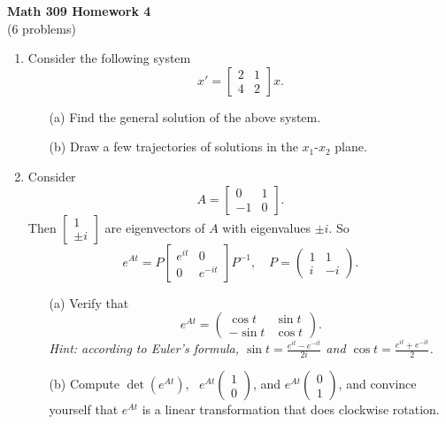 \documentclass[11pt]{article}
\theoremstyle{definition}
\begin{document}
\begin{center}
\textbf{Math 309 Homework 4}\\
(6 problems)
\end{center}
\vspace{0.15in}


\begin{enumerate}[leftmargin=*]

\item  Consider the following system 
\[
x'=\left[
\begin{array}{cc}
2 & 1\\
4 & 2
\end{array}\right]x.
\]
\begin{itemize}
\item [(a)] Find the general solution of the above system.   
\item [(b)] Draw a few trajectories of solutions in the $x_1$-$x_2$ plane. \\ 
\end{itemize}



\item Consider 
\[
A=\left[
\begin{array}{cc}
0 &1 \\
-1& 0
\end{array}\right].
\]
Then $
\left[\begin{array}{c}
1 \\
\pm i
\end{array}\right]$
are eigenvectors of $A$ with eigenvalues $\pm i$.  So 
\[
e^{At}= P \left[
\begin{array}{cc}
e^{it} &0 \\
0& e^{-it}
\end{array}\right]P^{-1},
\quad P=
\left(
\begin{array}{cc}
1 &1 \\
i & -i
\end{array}\right).
\]
\begin{itemize}
\item[(a)] Verify that 
\[e^{At}=\left(
\begin{array}{cc}
\cos t &\sin t \\
-\sin t&  \cos t
\end{array}\right).
\]
\emph{Hint: according to Euler's formula, $\sin t= \frac{e^{it}-e^{-it}}{2i}$ and $\cos t=\frac{e^{it}+e^{-it}}{2}$.}

\item[(b)] Compute $\det (e^{At})$, \ $e^{At}\left(\begin{array}{c}
1 \\
 0
\end{array}\right)$, and $e^{At}\left(\begin{array}{c}
0 \\
 1
\end{array}\right)$, and convince yourself that $e^{At}$ is a linear transformation that does clockwise rotation.  \\
\end{itemize}


\end{enumerate}
\end{document}
